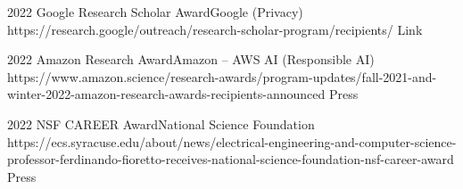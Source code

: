  

\begin{awards}
	\awardentry
	{2022}
	{Google Research Scholar Award}{Google (Privacy)}
	{https://research.google/outreach/research-scholar-program/recipients/}
	{Link}

	\awardentry
	{2022}
	{Amazon Research Award}{Amazon -- AWS AI (Responsible AI)}
	{https://www.amazon.science/research-awards/program-updates/fall-2021-and-winter-2022-amazon-research-awards-recipients-announced}%
	{Press}

	\awardentry
	{2022}
	{NSF CAREER Award}{National Science Foundation}
	{https://ecs.syracuse.edu/about/news/electrical-engineering-and-computer-science-professor-ferdinando-fioretto-receives-national-science-foundation-nsf-career-award}
	{Press}


\end{awards}
